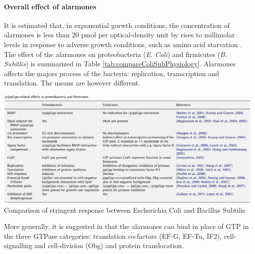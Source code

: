 \paragraph{Overall effect of alarmones}
It is estimated that, in exponential gorwth conditions, the concentration of alarmones is less than 20 pmol per optical-density unit by rises to millimolar levels in response to adverse growth conditions, such as amino acid starvation \citep{ababneh_rela_2015}. The effect of the alarmones on proteobacteria ({\it E. Coli}) and firmicutes ({\it B. Subitlis}) is summarized in Table \ref{tab:compareColiSubPhysiology}. Alarmones affects the majors process of the bacteria: replication, transcription and translation. The means are however different.
\begin{table}[hbtp]
  \centering
  \includegraphics[width=17cm]{figure/compareStringentColiSubtilisTable.png}\\
  \caption{Comparison of stringent response between Escherichia Coli and Bacillus Subtilis \citep{wolz_synthesis_2010}}\label{tab:compareColiSubPhysiology}
\end{table}
More generally, it is suggested in \citep{kanjee_direct_2012} that the alarmones can bind in place of GTP in the three GTPase categories: translation co-factors (EF-G, EF-Tu, IF2), cell-signalling and cell-division (Obg) and protein translocation.


